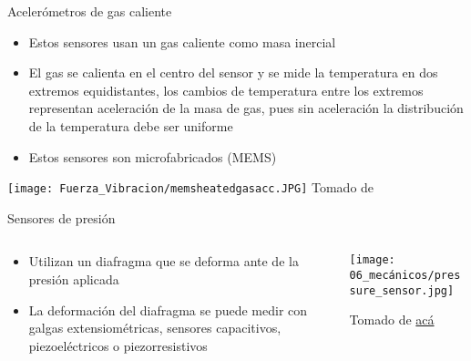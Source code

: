 \documentclass[aspectratio=169]{beamer}
\begin{document}
\begin{frame}{Acelerómetros de gas caliente}
            \begin{itemize}
                \item Estos sensores usan un gas caliente como masa inercial
                \item El gas se calienta en el centro del sensor y se mide la temperatura en dos extremos equidistantes, los cambios de temperatura entre los extremos representan aceleración de la masa de gas, pues sin aceleración la distribución de la temperatura debe ser uniforme
                \item Estos sensores son microfabricados (MEMS)
            \end{itemize}
            \centering
            \texttt{[image: Fuerza\_Vibracion/memsheatedgasacc.JPG]}
            \tiny{Tomado de \cite{Fraden_2016}}
\end{frame}

\begin{frame}{Sensores de presión}
    \begin{columns}[c, onlytextwidth]
        \begin{column}{0.6\textwidth}
            \begin{itemize}
                \item Utilizan un diafragma que se deforma ante de la presión aplicada
                \item La deformación del diafragma se puede medir con galgas extensiométricas, sensores capacitivos, piezoeléctricos o piezorresistivos
            \end{itemize}
        \end{column}
        \begin{column}{0.4\textwidth}
            \centering
            \texttt{[image: 06\_mecánicos/pressure\_sensor.jpg]}

            \tiny{Tomado de \href{https://www.processindustryforum.com/article/tips-effective-maintenance-pressure-sensors}{acá}}
        \end{column}
    \end{columns}
\end{frame}
\end{document}
